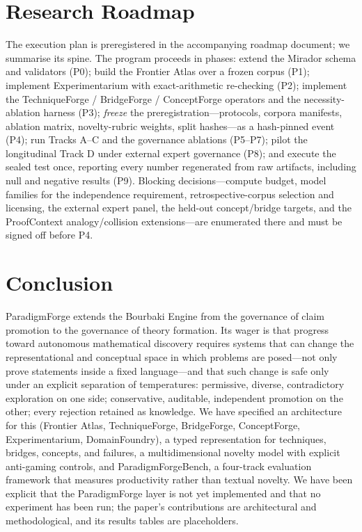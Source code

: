 \documentclass[11pt]{article}
\theoremstyle{definition}
\theoremstyle{remark}
\newcommand{\pfbench}{ParadigmForgeBench}
\newcommand{\PF}{ParadigmForge}
\begin{document}
\section{Research Roadmap}
\label{sec:roadmap}

The execution plan is preregistered in the accompanying roadmap document; we summarise its spine. The
program proceeds in phases: extend the Mirador schema and validators (P0); build the Frontier Atlas
over a frozen corpus (P1); implement Experimentarium with exact-arithmetic re-checking (P2);
implement the TechniqueForge / BridgeForge / ConceptForge operators and the necessity-ablation
harness (P3); \emph{freeze} the preregistration---protocols, corpora manifests, ablation matrix,
novelty-rubric weights, split hashes---as a hash-pinned event (P4); run Tracks A--C and the
governance ablations (P5--P7); pilot the longitudinal Track D under external expert governance (P8);
and execute the sealed test once, reporting every number regenerated from raw artifacts, including
null and negative results (P9). Blocking decisions---compute budget, model families for the
independence requirement, retrospective-corpus selection and licensing, the external expert panel,
the held-out concept/bridge targets, and the ProofContext analogy/collision extensions---are
enumerated there and must be signed off before P4.

\section{Conclusion}
\label{sec:conclusion}

\PF{} extends the Bourbaki Engine from the governance of claim promotion to the governance of theory
formation. Its wager is that progress toward autonomous mathematical discovery requires systems that
can change the representational and conceptual space in which problems are posed---not only prove
statements inside a fixed language---and that such change is safe only under an explicit separation of
temperatures: permissive, diverse, contradictory exploration on one side; conservative, auditable,
independent promotion on the other; every rejection retained as knowledge. We have specified an
architecture for this (Frontier Atlas, TechniqueForge, BridgeForge, ConceptForge, Experimentarium,
DomainFoundry), a typed representation for techniques, bridges, concepts, and failures, a
multidimensional novelty model with explicit anti-gaming controls, and \pfbench{}, a four-track
evaluation framework that measures productivity rather than textual novelty. We have been explicit
that the \PF{} layer is not yet implemented and that no experiment has been run; the paper's
contributions are architectural and methodological, and its results tables are placeholders.
\end{document}
